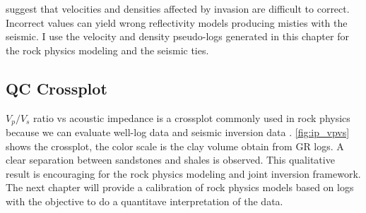 \cite{ref:han} suggest that velocities and densities affected by invasion are difficult to correct.
Incorrect values can yield wrong reflectivity models producing misties with the seismic. 
I use the velocity and density pseudo-logs generated in this chapter for 
the rock physics modeling and the seismic ties. 





\subsection{QC Crossplot}

$V_{p}/V_{s}$ ratio vs acoustic impedance is a crossplot commonly used in rock physics
because we can evaluate well-log data and seismic inversion data \citep{ref:avseth}.
\ref{fig:ip_vpvs} shows the crossplot, the color scale is the clay volume obtain
from GR logs. A clear separation between sandstones and shales is observed.
This qualitative result is encouraging for the rock physics modeling and 
joint inversion framework. The next chapter will provide a calibration of 
rock physics models based on logs with the objective to do a quantitave interpretation
of the data.




\newpage\mbox{}\newpage
